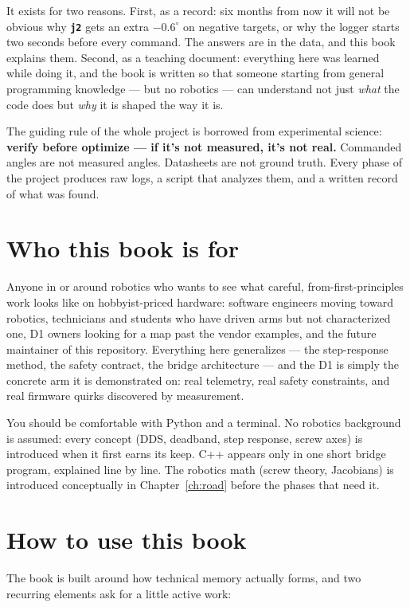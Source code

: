 \documentclass[11pt,twoside,openright]{book}
\newcommand{\code}[1]{\texttt{\bfseries #1}}
\begin{document}
It exists for two reasons. First, as a record: six months from now it will
not be obvious why \code{j2} gets an extra $-0.6^\circ$ on negative targets,
or why the logger starts two seconds before every command. The answers are
in the data, and this book explains them. Second, as a teaching document:
everything here was learned while doing it, and the book is written so that
someone starting from general programming knowledge --- but no robotics ---
can understand not just \emph{what} the code does but \emph{why} it is
shaped the way it is.

The guiding rule of the whole project is borrowed from experimental science:
\textbf{verify before optimize --- if it's not measured, it's not real.}
Commanded angles are not measured angles. Datasheets are not ground truth.
Every phase of the project produces raw logs, a script that analyzes them,
and a written record of what was found.

\section*{Who this book is for}

Anyone in or around robotics who wants to see what careful,
from-first-principles work looks like on hobbyist-priced hardware:
software engineers moving toward robotics, technicians and students who
have driven arms but not characterized one, D1 owners looking for a map
past the vendor examples, and the future maintainer of this repository.
Everything here generalizes --- the step-response method, the safety
contract, the bridge architecture --- and the D1 is simply the concrete
arm it is demonstrated on: real telemetry, real safety constraints, and
real firmware quirks discovered by measurement.

You should be comfortable with Python and a terminal. No robotics
background is assumed: every concept (DDS, deadband, step response, screw
axes) is introduced when it first earns its keep. C++ appears only in
one short bridge program, explained line by line. The robotics math (screw
theory, Jacobians) is introduced conceptually in Chapter~\ref{ch:road} before the phases
that need it.

\section*{How to use this book}

The book is built around how technical memory actually forms, and two
recurring elements ask for a little active work:
\end{document}
